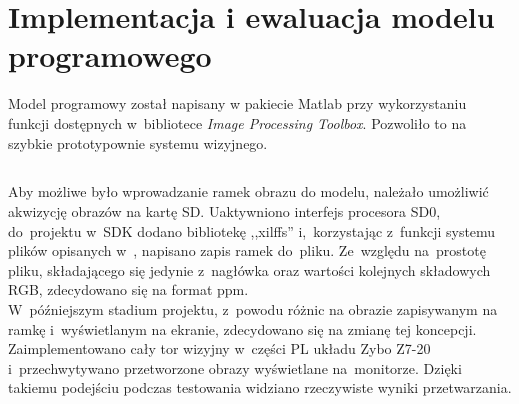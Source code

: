 
\section{Implementacja i ewaluacja modelu programowego}
\label{sec:implementacja_modelu_programowego}

Model programowy został napisany w pakiecie Matlab przy wykorzystaniu funkcji dostępnych w~bibliotece \textit{Image Processing Toolbox}. 
Pozwoliło to na szybkie prototypownie systemu wizyjnego.




\subsection{} 


Aby możliwe było wprowadzanie ramek obrazu do modelu, należało umożliwić akwizycję obrazów na kartę SD. 
Uaktywniono interfejs procesora SD0, do~projektu w~SDK dodano bibliotekę ,,xilffs'' i,~korzystając z~funkcji systemu plików opisanych w~\cite{xilffs}, napisano zapis ramek do~pliku. 
Ze~względu na~prostotę pliku, składającego się jedynie z~nagłówka oraz wartości kolejnych składowych RGB, zdecydowano się na format ppm.\\

W~późniejszym stadium projektu, z~powodu różnic na obrazie zapisywanym na ramkę i~wyświetlanym na ekranie, zdecydowano się na zmianę tej koncepcji.  %
Zaimplementowano cały tor wizyjny w~części PL układu Zybo Z7-20 i~przechwytywano przetworzone obrazy wyświetlane na~monitorze. 
Dzięki takiemu podejściu podczas testowania widziano rzeczywiste wyniki przetwarzania.







